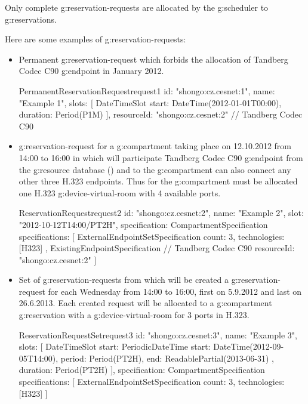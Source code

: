 Only complete \glspl{g:reservation-request} are allocated by the \gls{g:scheduler} to \glspl{g:reservation}.

Here are some examples of \glspl{g:reservation-request}:

\begin{itemize}

\item Permanent \gls{g:reservation-request} which forbids the allocation of Tandberg Codec C90 \gls{g:endpoint} in January 2012.

\label{oc:request1}
\begin{ObjectCode}{PermanentReservationRequest}{request1}{}
id: "shongo:cz.cesnet:1",
name: "Example 1",
slots: [
  DateTimeSlot {
    start: DateTime(2012-01-01T00:00),
    duration: Period(P1M)
  }
],
resourceId: "shongo:cz.cesnet:2" // Tandberg Codec C90
\end{ObjectCode}

\item \Gls{g:reservation-request} for a \gls{g:compartment} taking place on 12.10.2012 from 14:00 to 16:00 in which will participate Tandberg Codec C90 \gls{g:endpoint} from the \gls{g:resource} database () and to the \gls{g:compartment} can also connect any other three H.323 endpoints. Thus for the \gls{g:compartment} must be allocated one H.323 \gls{g:device-virtual-room} with 4 available ports.

\label{oc:request2}
\begin{ObjectCode}{ReservationRequest}{request2}{}
id: "shongo:cz.cesnet:2",
name: "Example 2",
slot: "2012-10-12T14:00/PT2H",
specification: CompartmentSpecification {
  specifications: [
    ExternalEndpointSetSpecification {
      count: 3,
      technologies: [H323]
    },
    ExistingEndpointSpecification { // Tandberg Codec C90
      resourceId: "shongo:cz.cesnet:2"
    }
  ]
}
\end{ObjectCode}

\item Set of \glspl{g:reservation-request} from which will be created a \gls{g:reservation-request} for each Wednesday from 14:00 to 16:00, first on 5.9.2012 and last on 26.6.2013. Each created request will be allocated to a \gls{g:compartment} \gls{g:reservation} with a \gls{g:device-virtual-room} for 3 ports in H.323.

\label{oc:request3}
\begin{ObjectCode}{ReservationRequestSet}{request3}{}
id: "shongo:cz.cesnet:3",
name: "Example 3",
slots: [
  DateTimeSlot {
    start: PeriodicDateTime{
      start: DateTime(2012-09-05T14:00),
      period: Period(PT2H),
      end: ReadablePartial(2013-06-31)
    },
    duration: Period(PT2H)
  }
],
specification: CompartmentSpecification {
  specifications: [
    ExternalEndpointSetSpecification {
      count: 3,
      technologies: [H323]
    }
  ]
}
\end{ObjectCode}


\end{itemize}
